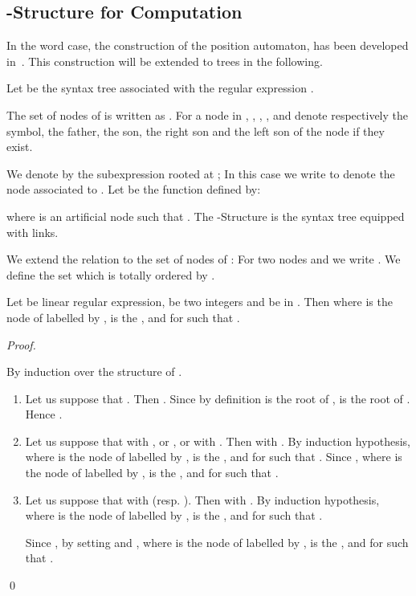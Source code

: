 \documentclass{llncs}
\begin{document}
\subsection{-Structure for  Computation}
In the word case, the construction of the position automaton, has been developed in~\cite{ZPC96,ZPC}. This construction will be extended to trees in the following.
 
Let  be the syntax tree associated with the regular expression  . 

The set of nodes of  is written as . For a node  in , , , ,  and  denote respectively the symbol, the father, the son, the right son and the left son of the node  if they exist. 

We denote by  the subexpression rooted at ; In this case we write  to denote the node associated to . Let  be the function defined by: 

 
    
    

\noindent where  is an artificial node such that . The -Structure is the syntax tree equipped with  links.

We extend the relation  to the set of nodes of : For two nodes  and  we write . We define the set  which is totally ordered by .


\begin{proposition}\label{b}
Let  be linear regular expression,  be two integers and  be in . Then  where  is the node of  labelled by ,  is the ,  and for  such that .
\end{proposition}
\begin{proof}
\begin{sloppy}
  By induction over the structure of .
  \begin{enumerate}
    \item Let us suppose that . Then . Since by definition  is the root of ,  is the root of . Hence .
    \item Let us suppose that  with , or , or  with . Then  with . By induction hypothesis,  where  is the node of  labelled by ,  is the ,  and for  such that . Since ,  where  is the node of  labelled by ,  is the ,  and for  such that 
.    
    \item Let us suppose that  with  (resp. ). Then  with . By induction hypothesis,  where  is the node of  labelled by ,  is the ,  and for  such that . 
    
    Since , by setting  and ,  where  is the node of  labelled by ,  is the ,  and for  such that .
  \end{enumerate}
\end{sloppy}  
  \qed
\end{proof}
\end{document}
